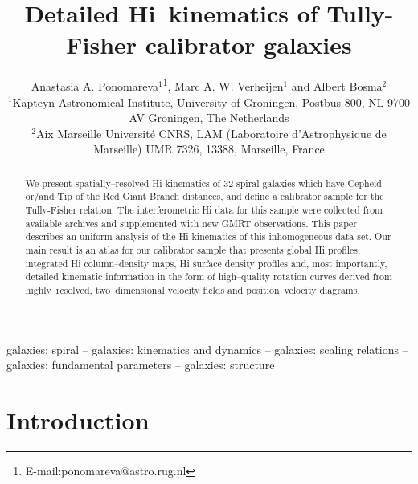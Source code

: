\documentclass[usenatbib,useAMS]{mnras}
\newcommand{\HI}{H{\sc i}}
\begin{document}
\title[H{\small I} kinematics of Tully-Fisher calibrators]
{Detailed \HI\ kinematics of Tully-Fisher calibrator galaxies} 
\author[Ponomareva et al.]
{Anastasia A. Ponomareva${^1}$\thanks{E-mail:ponomareva@astro.rug.nl}, 
Marc A. W. Verheijen${^1}$ and Albert Bosma${^2}$\vspace*{0.2cm}\\
$^1$Kapteyn Astronomical Institute, University of Groningen, Postbus 800, NL-9700 AV Groningen, The Netherlands\\
$^2$Aix Marseille Universit\'e CNRS, LAM (Laboratoire d'Astrophysique de Marseille) UMR 7326, 13388, Marseille, France\\}


\pagerange{\pageref{firstpage}--\pageref{lastpage}}

\maketitle

\label{firstpage}


\begin{abstract}

We present spatially--resolved H{\sc i} kinematics of 32 spiral
galaxies which have Cepheid or/and Tip of the Red Giant Branch
distances, and define a calibrator sample for the Tully-Fisher relation. 
The interferometric H{\sc i} data for this sample were collected
from available archives and supplemented with new GMRT observations. 
This paper describes an uniform analysis of the H{\sc i} kinematics of
this inhomogeneous data set.  Our main result is an atlas for our
calibrator sample that presents global H{\sc i} profiles, integrated
H{\sc i} column--density maps, H{\sc i} surface density profiles and,
most importantly, detailed kinematic information in the form of
high--quality rotation curves derived from highly--resolved,
two--dimensional velocity fields and position--velocity diagrams. 
  
\end{abstract}


\begin{keywords}
galaxies: spiral -- galaxies: kinematics and dynamics -- galaxies: scaling relations -- galaxies: fundamental parameters -- galaxies: structure
\end{keywords}

\section{Introduction}
\end{document}
